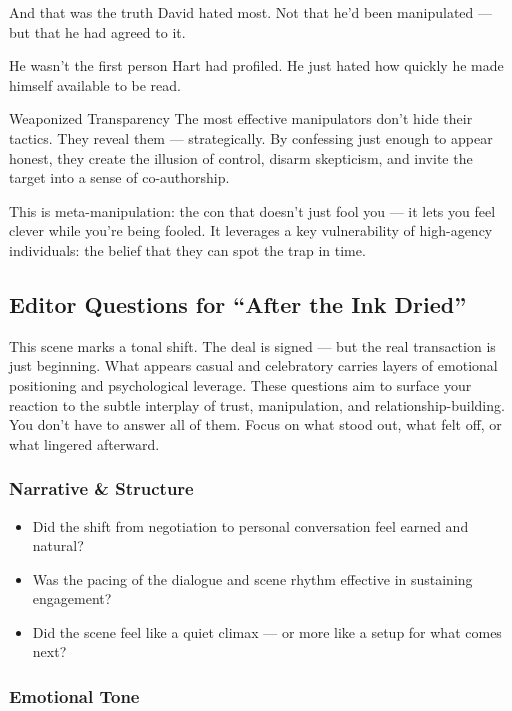 And that was the truth David hated most.
Not that he’d been manipulated — but that he had agreed to it.

He wasn’t the first person Hart had profiled.
He just hated how quickly he made himself available to be read.

\begin{PsychologicalSidebar}{Weaponized Transparency}
The most effective manipulators don’t hide their tactics. They reveal them — strategically.
By confessing just enough to appear honest, they create the illusion of control, disarm skepticism,
and invite the target into a sense of co-authorship.

This is meta-manipulation: the con that doesn’t just fool you — it lets you feel clever while you’re being fooled.
It leverages a key vulnerability of high-agency individuals: the belief that they can spot the trap in time.
\end{PsychologicalSidebar}




\subsection{Editor Questions for ``After the Ink Dried''}

This scene marks a tonal shift. The deal is signed — but the real transaction is just beginning. What appears casual and celebratory carries layers of emotional positioning and psychological leverage. These questions aim to surface your reaction to the subtle interplay of trust, manipulation, and relationship-building. You don’t have to answer all of them. Focus on what stood out, what felt off, or what lingered afterward.

\subsubsection{Narrative \& Structure}

\begin{itemize}
  \item Did the shift from negotiation to personal conversation feel earned and natural?
  \item Was the pacing of the dialogue and scene rhythm effective in sustaining engagement?
  \item Did the scene feel like a quiet climax — or more like a setup for what comes next?
\end{itemize}

\subsubsection{Emotional Tone}

